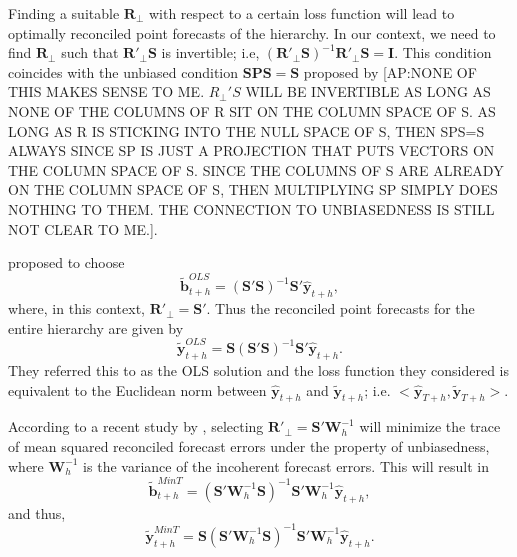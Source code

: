 \documentclass[a4paper, 11pt]{article}
\begin{document}
Finding a suitable $\bm{R}_\bot$ with respect to a certain loss function will lead to optimally reconciled point forecasts of the hierarchy. %
In our context, we need to find $\bm{R}_\bot$ such that $\bm{R}'_\bot \bm{S}$ is invertible; i.e, $(\bm{R}'_\bot \bm{S})^{-1}\bm{R}'_\bot \bm{S}=\bm{I}$. This condition coincides with the unbiased condition $\bm{SPS}=\bm{S}$ proposed by \citet{Hyndman2011}{\color{red}[AP:NONE OF THIS MAKES SENSE TO ME.  $R_{\perp}'S$ WILL BE INVERTIBLE AS LONG AS NONE OF THE COLUMNS OF R SIT ON THE COLUMN SPACE OF S. AS LONG AS R IS STICKING INTO THE NULL SPACE OF S, THEN SPS=S ALWAYS SINCE SP IS JUST A PROJECTION THAT PUTS VECTORS ON THE COLUMN SPACE OF S.  SINCE THE COLUMNS OF S ARE ALREADY ON THE COLUMN SPACE OF S, THEN MULTIPLYING SP SIMPLY DOES NOTHING TO THEM. THE CONNECTION TO UNBIASEDNESS IS STILL NOT CLEAR TO ME.]}.

\citet{Hyndman2011} proposed to choose
\begin{equation}
\tilde{\bm{b}}^{OLS}_{t+h}=(\bm{S}' \bm{S})^{-1}\bm{S}' \hat{\bm{y}}_{t+h},
\end{equation}
where, in this context, $\bm{R}'_\bot = \bm{S}'$. Thus the reconciled point forecasts for the entire hierarchy are given by
\begin{equation}
\tilde{\bm{y}}^{OLS}_{t+h}=\bm{S}(\bm{S}' \bm{S})^{-1}\bm{S}' \hat{\bm{y}}_{t+h}.
\end{equation}
They referred this to as the OLS solution and the loss function they considered is equivalent to the Euclidean norm between $\hat{\bm{y}}_{t+h}$ and $\tilde{\bm{y}}_{t+h}$; i.e. $<\hat{\bm{y}}_{T+h}, \tilde{\bm{y}}_{T+h}>$.

According to a recent study by \citet{Wickramasuriya2017}, selecting $\bm{R}'_\bot = \bm{S}'\bm{W}^{-1}_{h}$ will minimize the trace of mean squared reconciled forecast errors under the property of unbiasedness, where $\bm{W}^{-1}_{h}$ is the variance of the incoherent forecast errors. This will result in
\begin{equation}
\tilde{\bm{b}}^{MinT}_{t+h}=(\bm{S}'\bm{W}^{-1}_{h} \bm{S})^{-1}\bm{S}'\bm{W}^{-1}_{h} \hat{\bm{y}}_{t+h},
\end{equation}
and thus,
\begin{equation}
\tilde{\bm{y}}^{MinT}_{t+h}=\bm{S}(\bm{S}' \bm{W}^{-1}_{h}\bm{S})^{-1}\bm{S}'\bm{W}^{-1}_{h} \hat{\bm{y}}_{t+h}.
\end{equation}
\end{document}
